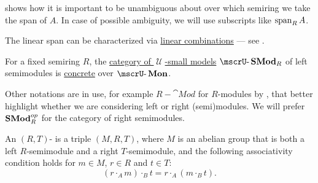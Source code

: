 \begin{definition}
\begin{thmenum}[resume=def:semimodule]
     shows how it is important to be unambiguous about over which semiring we take the span of \( A \). In case of possible ambiguity, we will use subscripts like \( \operatorname{span}_R A \).

    The linear span can be characterized via \hyperref[rem:linear_combinations]{linear combinations} --- see .

     For a fixed semiring \( R \), the \hyperref[def:category_of_small_first_order_models]{category of \( \mscrU \)-small models} \( \ucat{SMod}_R \) of left semimodules is \hyperref[def:concrete_category]{concrete} over \hyperref[def:monoid]{\( \ucat{Mon} \)}.

    Other notations are in use, for example \( R-\cat{Mod} \) for \( R \)-modules by , that better highlight whether we are considering left or right (semi)modules. We will prefer \( \operatorname{\mathbf{SMod}}_R^{op} \) for the category of right semimodules.

     An \( (R, T) \)- is a triple \( (M, R, T) \), where \( M \) is an abelian group that is both a left \( R \)-semimodule and a right \( T \)-semimodule, and the following associativity condition holds for \( m \in M \), \( r \in R \) and \( t \in T \):
    \begin{equation}\label{eq:def:semimodule/bisemimodule/associativity}
      (r \cdot_A m) \cdot_B t = r \cdot_A (m \cdot_B t).
    \end{equation}
  \end{thmenum}
\end{definition}
